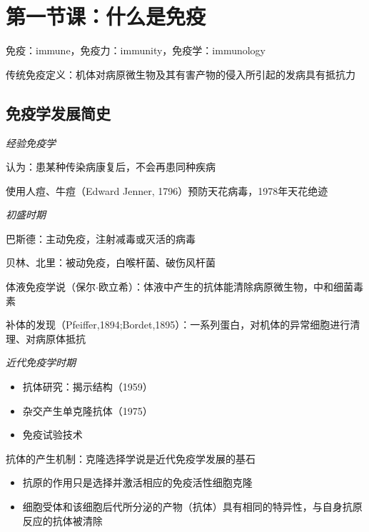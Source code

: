 \section{第一节课：什么是免疫}%
\label{sec:第一节课：什么是免疫}
\begin{notation}
    免疫：immune，免疫力：immunity，免疫学：immunology
\end{notation}
\begin{defi}
    传统免疫定义：机体对病原微生物及其有害产物的侵入所引起的发病具有抵抗力
\end{defi}
\subsection{免疫学发展简史}%
\label{sub:免疫学发展简史}
\textit{经验免疫学}
\begin{notation}
    认为：患某种传染病康复后，不会再患同种疾病
\end{notation}
\begin{eg}
    使用人痘、牛痘（Edward Jenner, 1796）预防天花病毒，1978年天花绝迹
\end{eg}
\textit{初盛时期}
\begin{eg}
    巴斯德：主动免疫，注射减毒或灭活的病毒

    贝林、北里：被动免疫，白喉杆菌、破伤风杆菌
\end{eg}
\begin{notation}
    体液免疫学说（保尔$\cdot $欧立希）：体液中产生的抗体能清除病原微生物，中和细菌毒素
\end{notation}
\begin{notation}
    补体的发现（Pfeiffer,1894;Bordet,1895）：一系列蛋白，对机体的异常细胞进行清理、对病原体抵抗
\end{notation}
\textit{近代免疫学时期}
\begin{notation}
    \begin{itemize}
        \item 抗体研究：揭示结构（1959）
        \item 杂交产生单克隆抗体（1975）
        \item 免疫试验技术
    \end{itemize}
\end{notation}
\begin{notation}
抗体的产生机制：克隆选择学说是近代免疫学发展的基石
\begin{itemize}
    \item 抗原的作用只是选择并激活相应的免疫活性细胞克隆
    \item 细胞受体和该细胞后代所分泌的产物（抗体）具有相同的特异性，与自身抗原反应的抗体被清除
\end{itemize}
\end{notation}
